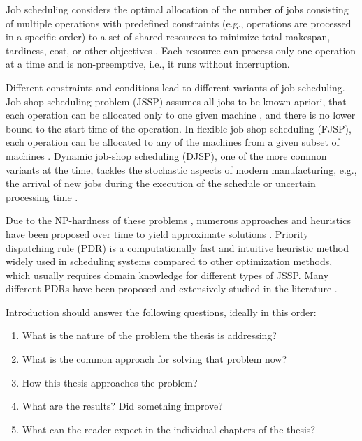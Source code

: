 

Job scheduling considers the optimal allocation of the number of jobs consisting of multiple operations with predefined constraints (e.g., operations are processed in a 
specific order) to a set of shared resources to minimize total makespan, tardiness, cost, or other objectives \cite{YamadaNakanoJSSP}. Each resource can process only one operation at a time and is non-preemptive, i.e., it runs without interruption.
\par
Different constraints and conditions lead to different variants of job scheduling. 
Job shop scheduling problem (JSSP) assumes all jobs to be known apriori, that each operation can be allocated only to one given machine \cite{YamadaNakanoJSSP}, and there is no lower bound to the start time of the operation. In flexible job-shop scheduling (FJSP), each operation can be allocated to any of the machines from a given subset of machines \cite{DAUZEREPERES2024409}. Dynamic job-shop scheduling (DJSP), one of the more common variants at the time, tackles the stochastic aspects of modern manufacturing, e.g., the arrival of new jobs during the execution of the schedule or uncertain processing time \cite{MOHAN201934}.
\par
Due to the NP-hardness of these problems \cite{Garey1976TheCO}, numerous approaches and heuristics have been proposed over time to yield approximate solutions \cite{Jansen2000ApproximationAF}. Priority dispatching rule (PDR) \cite{Haupt1989ASO} is a computationally fast and intuitive heuristic method widely used in scheduling systems compared to other optimization methods, which usually requires domain knowledge for different types of JSSP. Many different PDRs have been proposed and extensively studied in the literature \cite{doi:10.1080/00207543.2011.611539}. 




Introduction should answer the following questions, ideally in this order:
\begin{enumerate}
\item What is the nature of the problem the thesis is addressing?
\item What is the common approach for solving that problem now?
\item How this thesis approaches the problem?
\item What are the results? Did something improve?
\item What can the reader expect in the individual chapters of the thesis?
\end{enumerate}

